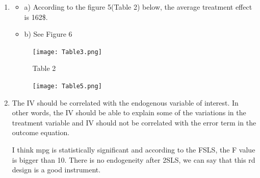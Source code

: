 \documentclass{article}
\begin{document}
\begin{enumerate}

\item 
\begin{itemize}
    \item a) According to the figure 5(Table 2) below, the average treatment effect is 162\$. 
    \item b) See Figure 6
\end{itemize}

\begin{figure}[htbp]
\centering
\texttt{[image: Table3.png]}
\caption{Table 2}
\label{fig:}
\end{figure}

\begin{figure}[htbp]
\centering
\texttt{[image: Table5.png]}
\caption{}
\label{fig:}
\end{figure}

\vspace{0.5cm}
\item 

\vspace{0.5cm}

The IV should be correlated with the endogenous variable of interest. In other words, the IV should be able to explain some of the variations in the treatment variable and IV should not be correlated with the error term in the outcome equation.

I think mpg is statistically significant and according to the FSLS, the F value is bigger than 10. There is no endogeneity after 2SLS, we can say that this rd design is a good instrument.  
 

\end{enumerate}
\end{document}
